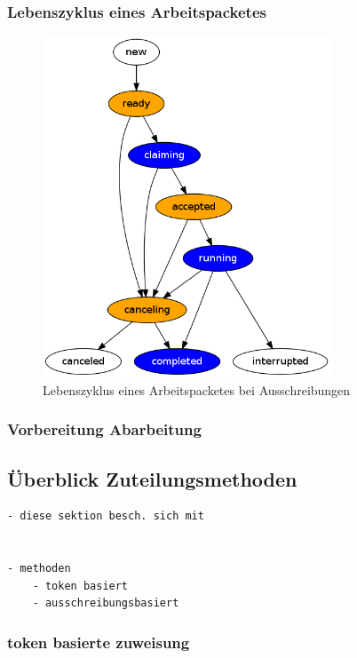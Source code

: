 \subsubsection{Lebenszyklus eines Arbeitspacketes}


\begin{figure}[ht] 
  \label{fig:lebenszyklus-arbeitspaket}
  \begin{center}
      \includegraphics[height=4in]{imageinput/lebenszyklus-arbeitspaket.png}
  \end{center}
  \caption{Lebenszyklus eines Arbeitspacketes bei Ausschreibungen}
\end{figure}


\subsubsection{Vorbereitung Abarbeitung}

\subsection{\"Uberblick Zuteilungsmethoden}


\begin{verbatim}
- diese sektion besch. sich mit


- methoden
    - token basiert
    - ausschreibungsbasiert

\end{verbatim}


\subsubsection{token basierte zuweisung}

